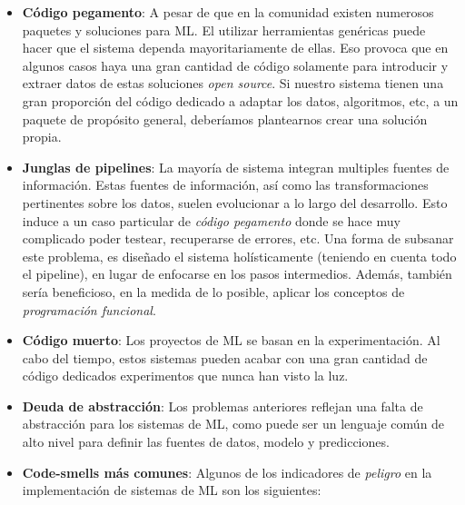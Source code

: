 \documentclass[
  12pt,
  a4paperpaper,
]{report}
\begin{document}
\begin{itemize}
\item
  \textbf{Código pegamento}: A pesar de que en la comunidad existen
  numerosos paquetes y soluciones para ML. El utilizar herramientas
  genéricas puede hacer que el sistema dependa mayoritariamente de
  ellas. Eso provoca que en algunos casos haya una gran cantidad de
  código solamente para introducir y extraer datos de estas soluciones
  \emph{open source}. Si nuestro sistema tienen una gran proporción del
  código dedicado a adaptar los datos, algoritmos, etc, a un paquete de
  propósito general, deberíamos plantearnos crear una solución propia.
\item
  \textbf{Junglas de pipelines}: La mayoría de sistema integran
  multiples fuentes de información. Estas fuentes de información, así
  como las transformaciones pertinentes sobre los datos, suelen
  evolucionar a lo largo del desarrollo. Esto induce a un caso
  particular de \emph{código pegamento} donde se hace muy complicado
  poder testear, recuperarse de errores, etc. Una forma de subsanar este
  problema, es diseñado el sistema holísticamente (teniendo en cuenta
  todo el pipeline), en lugar de enfocarse en los pasos intermedios.
  Además, también sería beneficioso, en la medida de lo posible, aplicar
  los conceptos de \emph{programación funcional}.
\item
  \textbf{Código muerto}: Los proyectos de ML se basan en la
  experimentación. Al cabo del tiempo, estos sistemas pueden acabar con
  una gran cantidad de código dedicados experimentos que nunca han visto
  la luz.
\item
  \textbf{Deuda de abstracción}: Los problemas anteriores reflejan una
  falta de abstracción para los sistemas de ML, como puede ser un
  lenguaje común de alto nivel para definir las fuentes de datos, modelo
  y predicciones.
\item
  \textbf{Code-smells más comunes}: Algunos de los indicadores de
  \emph{peligro} en la implementación de sistemas de ML son los
  siguientes:


\end{itemize}
\end{document}
